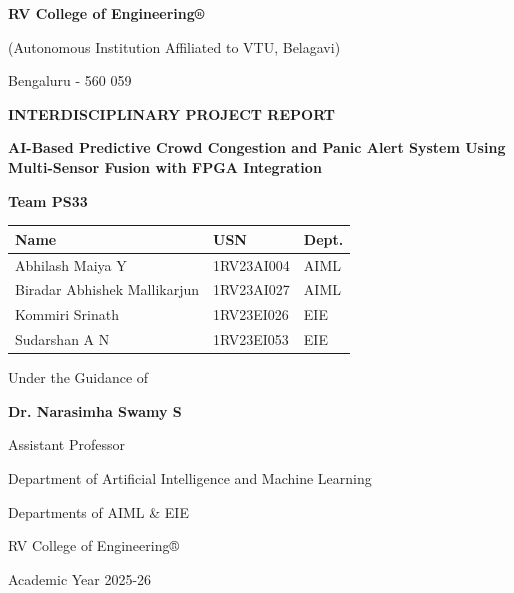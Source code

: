 \documentclass[12pt,oneside,a4paper]{book}
\begin{document}
\begin{titlepage}
    \centering
    \vspace*{1cm}
    {\Large \textbf{RV College of Engineering®} \par}
    {\small (Autonomous Institution Affiliated to VTU, Belagavi) \par}
    {\small Bengaluru - 560 059 \par}
    \vspace{1cm}
    \vspace{1cm}

    {\Large \textbf{INTERDISCIPLINARY PROJECT REPORT} \par}
    \vspace{0.8cm}

    {\Huge \textbf{AI-Based Predictive Crowd Congestion and Panic Alert System Using Multi-Sensor Fusion with FPGA Integration} \par}
    \vspace{1.2cm}

    {\Large \textbf{Team PS33} \par}
    \vspace{0.5cm}

    {\large
    \begin{tabular}{lll}
    \textbf{Name} & \textbf{USN} & \textbf{Dept.} \\
    \midrule
    Abhilash Maiya Y & 1RV23AI004 & AIML \\
    Biradar Abhishek Mallikarjun & 1RV23AI027 & AIML \\
    Kommiri Srinath & 1RV23EI026 & EIE \\
    Sudarshan A N & 1RV23EI053 & EIE \\
    \bottomrule
    \end{tabular}
    \par}

    \vspace{1cm}

    {\Large Under the Guidance of \par}
    \vspace{0.4cm}

    {\Large \textbf{Dr. Narasimha Swamy S} \par}
    {\small Assistant Professor \par}
    {\small Department of Artificial Intelligence and Machine Learning \par}

    \vfill

    {\Large Departments of AIML \& EIE \par}
    {\Large RV College of Engineering® \par}
    {\Large Academic Year 2025-26 \par}

\end{titlepage}
\end{document}
